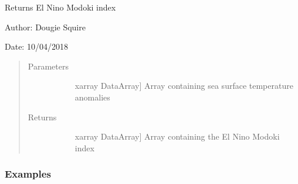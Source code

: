 \documentclass[letterpaper,10pt,english]{sphinxmanual}
\begin{document}

\begin{fulllineitems}
\label{\detokenize{diagnostic_doc:diagnostic.emi}}
Returns El Nino Modoki index

\begin{DUlineblock}{0em}
\item[] Author: Dougie Squire
\item[] Date: 10/04/2018
\end{DUlineblock}
\begin{quote}\begin{description}
\item[{Parameters}] \leavevmode\begin{description}
\item[{}] \leavevmode{[}xarray DataArray{]}
Array containing sea surface temperature anomalies

\end{description}

\item[{Returns}] \leavevmode\begin{description}
\item[{}] \leavevmode{[}xarray DataArray{]}
Array containing the El Nino Modoki index

\end{description}

\end{description}\end{quote}
\subsubsection*{Examples}


\end{fulllineitems}
\end{document}
